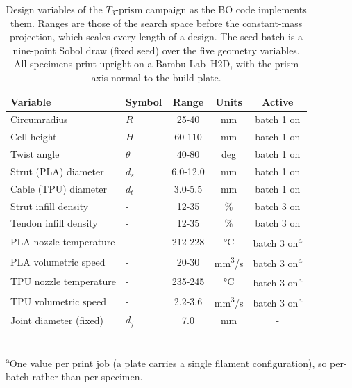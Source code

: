 \documentclass[11pt]{article}
\begin{document}
\begin{table}[!htbp]
  \centering
  \caption{Design variables of the $T_3$-prism campaign as the BO code
    implements them. Ranges are those of the search space before the
    constant-mass projection, which scales every length of a design.
    The seed batch is a nine-point Sobol draw (fixed seed) over the five
    geometry variables. All specimens print upright on a Bambu Lab~H2D,
    with the prism axis normal to the build plate.}
  \label{tab:design-vars}
  \small
  \begin{tabular}{@{}llccc@{}}
    \toprule
    Variable & Symbol & Range & Units & Active \\
    \midrule
    Circumradius           & $R$       & 25-40 & mm  & batch 1 on \\
    Cell height            & $H$       & 60-110 & mm  & batch 1 on \\
    Twist angle            & $\theta$  & 40-80 & deg & batch 1 on \\
    Strut (PLA) diameter   & $d_s$     & 6.0-12.0 & mm  & batch 1 on \\
    Cable (TPU) diameter   & $d_t$     & 3.0-5.5 & mm  & batch 1 on \\
    Strut infill density   & -        & 12-35 & \%  & batch 3 on \\
    Tendon infill density  & -        & 12-35 & \%  & batch 3 on \\
    PLA nozzle temperature & -        & 212-228 & \si{\celsius} & batch 3 on\textsuperscript{a} \\
    PLA volumetric speed   & -        & 20-30 & \si{mm^3/s} & batch 3 on\textsuperscript{a} \\
    TPU nozzle temperature & -        & 235-245 & \si{\celsius} & batch 3 on\textsuperscript{a} \\
    TPU volumetric speed   & -        & 2.2-3.6 & \si{mm^3/s} & batch 3 on\textsuperscript{a} \\
    Joint diameter (fixed) & $d_j$     & 7.0 & mm  & - \\
    \bottomrule
  \end{tabular}\\[2pt]
  {\footnotesize \textsuperscript{a}One value per print job (a plate
  carries a single filament configuration), so per-batch rather than
  per-specimen.}
\end{table}
\end{document}
